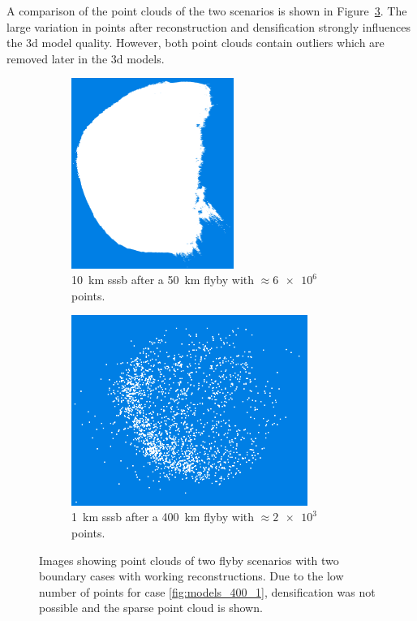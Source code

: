 A comparison of the point clouds of the two scenarios is shown in Figure~\ref{fig:points_dense_comp}. The large variation in points after reconstruction and densification strongly influences the \gls{3d} model quality. However, both point clouds contain outliers which are removed later in the \gls{3d} models.

\begin{figure}[htb]
    \centering
        \begin{subfigure}[b]{0.42\textwidth}
            \centering
            \includegraphics[width=\textwidth,height=6.2cm]{doc/thesis/0_figures/models_quality/50_10/120_50_10_dense2.png}
            \caption{\SI{10}{\kilo\meter} \gls{sssb} after a \SI{50}{\kilo\meter} flyby with $\approx\SI{6e6}{}$ points.}
            \label{fig:points_50_10}
        \end{subfigure}
        \begin{subfigure}[b]{0.42\textwidth}
            \centering
            \includegraphics[width=\textwidth,height=6.2cm]{doc/thesis/0_figures/models_quality/400_1/120_400_1_points2.png}
            \caption{\SI{1}{\kilo\meter} \gls{sssb} after a \SI{400}{\kilo\meter} flyby with $\approx\SI{2e3}{}$ points.}
            \label{fig:points_400_1}
        \end{subfigure}
    \caption{Images showing point clouds of two flyby scenarios with two boundary cases with working reconstructions. Due to the low number of points for case \ref{fig:models_400_1}, densification was not possible and the sparse point cloud is shown.}
    \label{fig:points_dense_comp}
\end{figure}

